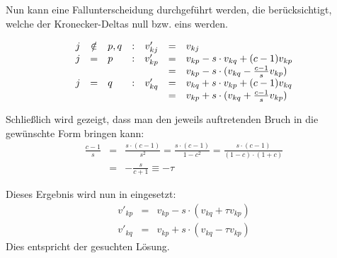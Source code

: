 Nun kann eine Fallunterscheidung durchgeführt werden, die berücksichtigt,
welche der Kronecker-Deltas null bzw. eins werden.

\begin{eqnarray}
\begin{array}[h]{cclcccl}
j &\notin& {p,q} &:& v'_{kj} &=& v_{kj}\\
j &=& p &:& v'_{kp} &=& v_{kp} - s\cdot v_{kq} + (c-1)v_{kp}\\
&&&&&=& v_{kp} - s\cdot(v_{kq} - \frac{c-1}{s}v_{kp})\\
j &=& q &:& v'_{kq} &=& v_{kq} + s\cdot v_{kp} + (c-1)v_{kq}\\
&&&&&=& v_{kp} + s\cdot(v_{kq} + \frac{c-1}{s}v_{kp})
\end{array}
\label{eqn:vmatrix}
\end{eqnarray}

Schließlich wird gezeigt, dass man den jeweils auftretenden Bruch in die
gewünschte Form bringen kann:
\begin{eqnarray}
\frac{c-1}{s} &=& \frac{s\cdot(c-1)}{s^2} = \frac{s\cdot(c-1)}{1-c^2} =
\frac{s\cdot(c-1)}{(1-c)\cdot(1+c)}\\
&=& -\frac{s}{c+1} \equiv -τ 
\end{eqnarray}

Dieses Ergebnis wird nun in  eingesetzt:
\begin{eqnarray}
v'_{kp} &=& v_{kp} - s\cdot(v_{kq} + τv_{kp})\\
v'_{kq} &=& v_{kp} + s\cdot(v_{kq} - τv_{kp})
\end{eqnarray}
Dies entspricht der gesuchten Lösung.